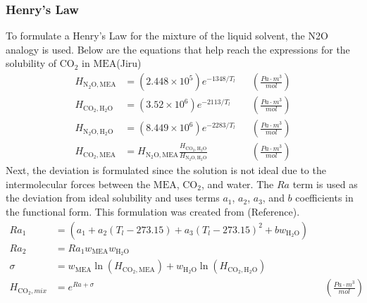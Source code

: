 \documentclass[12pt, letterpaper]{article}
\begin{document}
            \subsubsection{Henry's Law}
                To formulate a Henry's Law for the mixture of the liquid solvent, the N2O analogy is used.
                Below are the equations that help reach the expressions for the solubility of $\mathrm{CO}_2$ in $\mathrm{MEA}$(Jiru)
                \begin{align}
                    H_{\mathrm{N_{2}O},\mathrm{MEA}} &= \left(2.448 \times 10^5\right) e^{-1348/T_l} && \left(\frac{\unit{Pa} \cdot \unit{m}^3}{\unit{mol}} \right)\\
                    H_{\mathrm{CO}_2, \mathrm{H_{2}O}} &= \left(3.52 \times 10^6\right) e^{-2113/T_l} && \left(\frac{\unit{Pa} \cdot \unit{m}^3}{\unit{mol}} \right)\\
                    H_{\mathrm{N_{2}O},\mathrm{H_{2}O}} &= \left(8.449 \times 10^6\right) e^{-2283/T_l} && \left(\frac{\unit{Pa} \cdot \unit{m}^3}{\unit{mol}} \right)\\
                    H_{\mathrm{CO}_2,\mathrm{MEA}} &= H_{\mathrm{N_{2}O},\mathrm{MEA}} \frac{H_{\mathrm{CO}_2, \mathrm{H_{2}O}}}{H_{\mathrm{N_{2}O},\mathrm{H_{2}O}}} && \left(\frac{\unit{Pa} \cdot \unit{m}^3}{\unit{mol}} \right)
                \end{align}
                Next, the deviation is formulated since the solution is not ideal due to the intermolecular forces between the $\mathrm{MEA}$, $\mathrm{CO}_2$, and water.
                The $Ra$ term is used as the deviation from ideal solubility and uses terms $a_1$, $a_2$, $a_3$, and $b$ coefficients in the functional form.
                This formulation was created from (Reference).
                \begin{align}
                    Ra_1 &= \left(a_1+a_2 \left(T_l-273.15\right)+a_3 \left(T_l-273.15\right)^2+b w_{\mathrm{H_{2}O}} \right) \\
                    Ra_2 &= Ra_1 w_{\mathrm{MEA}} w_{\mathrm{H_{2}O}} \\
                    \sigma &= w_{\mathrm{MEA}} \ln\left(H_{\mathrm{CO}_2,\mathrm{MEA}}\right)+w_{\mathrm{H_{2}O}} \ln\left(H_{\mathrm{CO}_2,\mathrm{H_{2}O}}\right) \\
                    H_{\mathrm{CO}_2,mix} &= e^{Ra + \sigma} && \left(\frac{\unit{Pa} \cdot \unit{m}^3}{\unit{mol}} \right)
                \end{align}
            
\end{document}
